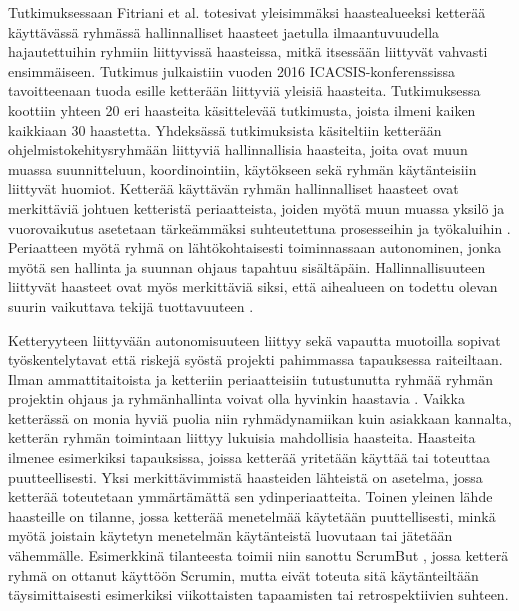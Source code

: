 Tutkimuksessaan Fitriani et al. \cite{7872736} totesivat yleisimmäksi haastealueeksi ketterää käyttävässä ryhmässä hallinnalliset haasteet jaetulla ilmaantuvuudella hajautettuihin ryhmiin liittyvissä haasteissa, mitkä itsessään liittyvät vahvasti ensimmäiseen. Tutkimus julkaistiin vuoden 2016 ICACSIS-konferenssissa tavoitteenaan tuoda esille ketterään liittyviä yleisiä haasteita. Tutkimuksessa koottiin yhteen 20 eri haasteita käsittelevää tutkimusta, joista ilmeni kaiken kaikkiaan 30 haastetta. Yhdeksässä tutkimuksista käsiteltiin ketterään ohjelmistokehitysryhmään liittyviä hallinnallisia haasteita, joita ovat muun muassa suunnitteluun, koordinointiin, käytökseen sekä ryhmän käytänteisiin liittyvät huomiot. Ketterää käyttävän ryhmän hallinnalliset haasteet ovat merkittäviä johtuen ketteristä periaatteista, joiden myötä muun muassa yksilö ja vuorovaikutus asetetaan tärkeämmäksi suhteutettuna prosesseihin ja työkaluihin \cite{beck2001agile}. Periaatteen myötä ryhmä on lähtökohtaisesti toiminnassaan autonominen, jonka myötä sen hallinta ja suunnan ohjaus tapahtuu sisältäpäin. Hallinnallisuuteen liittyvät haasteet ovat myös merkittäviä siksi, että aihealueen on todettu olevan suurin vaikuttava tekijä tuottavuuteen \cite{DEOMELO2013412}.

Ketteryyteen liittyvään autonomisuuteen liittyy sekä vapautta muotoilla sopivat työskentelytavat että riskejä syöstä projekti pahimmassa tapauksessa raiteiltaan. Ilman ammattitaitoista ja ketteriin periaatteisiin tutustunutta ryhmää ryhmän projektin ohjaus ja ryhmänhallinta voivat olla hyvinkin haastavia \cite{7872736}. Vaikka ketterässä on monia hyviä puolia niin ryhmädynamiikan kuin asiakkaan kannalta, ketterän ryhmän toimintaan liittyy lukuisia mahdollisia haasteita. Haasteita ilmenee esimerkiksi tapauksissa, joissa ketterää yritetään käyttää tai toteuttaa puutteellisesti. Yksi merkittävimmistä haasteiden lähteistä on asetelma, jossa ketterää toteutetaan ymmärtämättä sen ydinperiaatteita. Toinen yleinen lähde haasteille on tilanne, jossa ketterää menetelmää käytetään puuttellisesti, minkä myötä joistain käytetyn menetelmän käytänteistä luovutaan tai jätetään vähemmälle. Esimerkkinä tilanteesta toimii niin sanottu ScrumBut \cite{SCRUMBUT}, jossa ketterä ryhmä on ottanut käyttöön Scrumin, mutta eivät toteuta sitä käytänteiltään täysimittaisesti esimerkiksi viikottaisten tapaamisten tai retrospektiivien suhteen.

